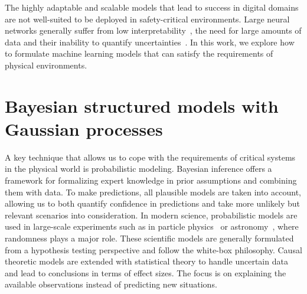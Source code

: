 The highly adaptable and scalable models that lead to success in digital domains are not well-suited to be deployed in safety-critical environments.
Large neural networks generally suffer from low interpretability~\parencite{rudin_stop_2019}, the need for large amounts of data and their inability to quantify uncertainties~\parencite{goodfellow_deep_2016}.
In this work, we explore how to formulate machine learning models that can satisfy the requirements of physical environments.


\section{Bayesian structured models with Gaussian processes}
A key technique that allows us to cope with the requirements of critical systems in the physical world is probabilistic modeling.
Bayesian inference offers a framework for formalizing expert knowledge in prior assumptions and combining them with data.
To make predictions, all plausible models are taken into account, allowing us to both quantify confidence in predictions and take more unlikely but relevant scenarios into consideration.
In modern science, probabilistic models are used in large-scale experiments such as in particle physics~\parencite{khachatryan_observation_2015} or astronomy~\parencite{collaboration_first_2019,the_ligo_scientific_collaboration_observation_2016}, where randomness plays a major role.
These scientific models are generally formulated from a hypothesis testing perspective and follow the white-box philosophy.
Causal theoretic models are extended with statistical theory to handle uncertain data and lead to conclusions in terms of effect sizes.
The focus is on explaining the available observations instead of predicting new situations.

